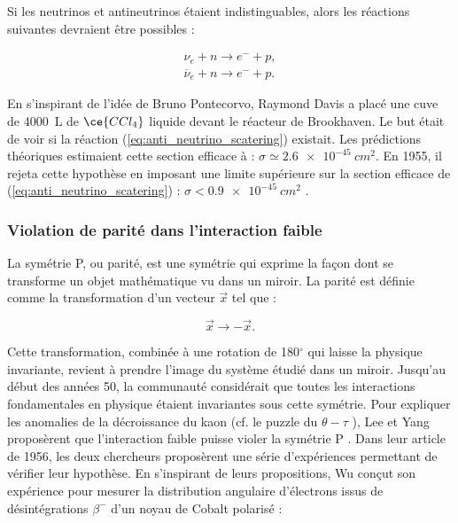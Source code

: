 Si les neutrinos et antineutrinos étaient indistinguables, alors les réactions suivantes devraient être possibles :

\begin{align}
    \nu_e + n \rightarrow e^- + p,\\
    \overline{\nu}_e + n \rightarrow e^- + p.
    \label{eq:anti_neutrino_scatering}
\end{align}

\bigbreak

En s'inspirant de l'idée de Bruno Pontecorvo, Raymond Davis a placé une cuve de \SI{4000}{L} de $\ce{CCl_4}$ liquide devant le réacteur de Brookhaven. Le but était de voir si la réaction (\ref{eq:anti_neutrino_scatering}) existait. Les prédictions théoriques estimaient cette section efficace à : $\sigma \simeq \SI{2.6e-45}{cm^2}$. En 1955, il rejeta cette hypothèse en imposant une limite supérieure sur la section efficace de (\ref{eq:anti_neutrino_scatering}) : $\sigma < \SI{0.9e-45}{cm^2}$ \cite{Davis:1955bi}.

\bigbreak

\subsubsection*{Violation de parité dans l'interaction faible}

La symétrie P, ou parité, est une symétrie qui exprime la façon dont se transforme un objet mathématique vu dans un miroir. La parité est définie comme la transformation d'un vecteur $\overrightarrow{x}$ tel que :

\begin{equation}
    \overrightarrow{x} \rightarrow -\overrightarrow{x}.
\end{equation}

\bigbreak

Cette transformation, combinée à une rotation de 180$^{\circ}$ qui laisse la physique invariante, revient à prendre l'image du système étudié dans un miroir. Jusqu'au début des années 50, la communauté considérait que toutes les interactions fondamentales en physique étaient invariantes sous cette symétrie. Pour expliquer les anomalies de la décroissance du kaon (cf. le puzzle du $\theta-\tau$ \cite{Dalitz:1993yt}), Lee et Yang proposèrent que l'interaction faible puisse violer la symétrie P \cite{Lee:1956qn}. Dans leur article de 1956, les deux chercheurs proposèrent une série d'expériences permettant de vérifier leur hypothèse. En s'inspirant de leurs propositions, Wu conçut son expérience pour mesurer la distribution angulaire d'électrons issus de désintégrations $\beta^-$ d'un noyau de Cobalt polarisé \cite{Wu:1957my} :

